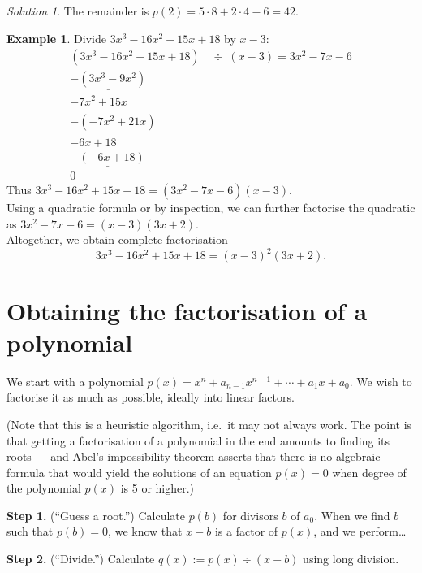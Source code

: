 \documentclass[
  12pt,
  oneside]{book}
\theoremstyle{definition}
\theoremstyle{definition}
\newtheorem{example}{Example}[chapter]
\theoremstyle{definition}
\theoremstyle{definition}
\theoremstyle{remark}
\newtheorem*{solution}{Solution}
\begin{document}
\begin{solution}
The remainder is \(p(2) = 5\cdot8+2\cdot4-6=42\).
\end{solution}

\begin{example}
Divide \(3x^3-16x^2+15x+18\) by \(x-3\):
\[
\begin{array}{rl}
(3x^3-16x^2+15x+18) &\div \,\,\,(x-3) = 3x^2-7x-6\\
\underline{-(3x^3-9x^2)}\phantom{+15x+18x}\\
-7x^2 + 15x\phantom{+18x)}\\
\underline{-(-7x^2+21x)}\phantom{+18o}\\
-6x+18\phantom{x}\\
\underline{-(-6x+18)}\\
0\phantom{x}
\end{array}
\]
Thus \(3x^3-16x^2+15x+18 = (3x^2-7x-6)(x-3)\).\\
Using a quadratic formula or by inspection, we can further factorise the quadratic as \(3x^2-7x-6 = (x-3)(3x+2)\).\\
Altogether, we obtain complete factorisation
\[3x^3-16x^2+15x+18=(x-3)^2(3x+2).\]
\end{example}

\hypertarget{obtaining-the-factorisation-of-a-polynomial}{%
\section{Obtaining the factorisation of a polynomial}\label{obtaining-the-factorisation-of-a-polynomial}}

We start with a polynomial \(p(x)=x^n+a_{n-1}x^{n-1}+\cdots+a_1x+a_0\). We wish to factorise it as much as possible, ideally into linear factors.

(Note that this is a heuristic algorithm, i.e.~it may not always work. The
point is that getting a factorisation of a polynomial in the end amounts to
finding its roots --- and Abel's impossibility theorem asserts that there is no
algebraic formula that would yield the solutions of an equation \(p(x)=0\) when
degree of the polynomial \(p(x)\) is 5 or higher.)

\textbf{Step 1.} (``Guess a root.'') Calculate \(p(b)\) for divisors \(b\) of \(a_0\). When we find \(b\) such that \(p(b)=0\), we know that \(x-b\) is a factor of \(p(x)\), and we perform\dots

\textbf{Step 2.} (``Divide.'') Calculate \(q(x) := p(x)\div(x-b)\) using long division.
\end{document}
